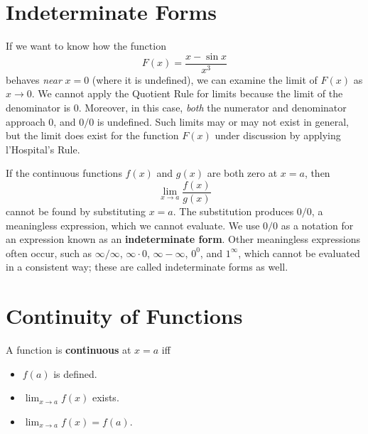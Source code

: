 \section{Indeterminate Forms}

If we want to know how the function
$$F(x)=\frac{x-\sin x}{x^3}$$
behaves \emph{near} $x=0$ (where it is undefined), we can examine the limit of $F(x)$ as $x \to 0$. We cannot apply the Quotient Rule for limits because the limit of the denominator is $0$. Moreover, in this case, \emph{both} the numerator and denominator approach $0$, and $0/0$ is undefined. Such limits may or may not exist in general, but the limit does exist for the function $F(x)$ under discussion by applying l'Hospital's Rule.

If the continuous functions $f(x)$ and $g(x)$ are both zero at $x=a$, then
$$\lim_{x \to a} \frac{f(x)}{g(x)}$$
cannot be found by substituting $x=a$. The substitution produces $0/0$, a meaningless expression, which we cannot evaluate. We use $0/0$ as a notation for an expression known as an \textbf{indeterminate form}. Other meaningless expressions often occur, such as $\infty / \infty$, $\infty \cdot 0$, $\infty - \infty$, $0^0$, and $1^{\infty}$, which cannot be evaluated in a consistent way; these are called indeterminate forms as well.

\section{Continuity of Functions}
\begin{defn}
  A function is \textbf{continuous} at $x=a$ iff
  \begin{itemize}
    \item $f(a)$ is defined.
    \item $\lim_{x\to a} f(x)$ exists.
    \item $\lim_{x\to a} f(x)=f(a)$.
  \end{itemize}
\end{defn}
